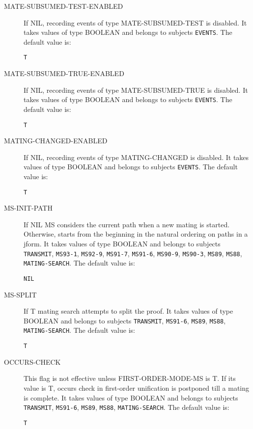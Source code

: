 \begin{description}
\item[MATE-SUBSUMED-TEST-ENABLED]  
If NIL, recording events of type MATE-SUBSUMED-TEST is disabled.
It takes values of type BOOLEAN and belongs to subjects \texttt{EVENTS}.  The default value is: \begin{lstlisting}
T
\end{lstlisting}

\item[MATE-SUBSUMED-TRUE-ENABLED]  
If NIL, recording events of type MATE-SUBSUMED-TRUE is disabled.
It takes values of type BOOLEAN and belongs to subjects \texttt{EVENTS}.  The default value is: \begin{lstlisting}
T
\end{lstlisting}

\item[MATING-CHANGED-ENABLED]  
If NIL, recording events of type MATING-CHANGED is disabled.
It takes values of type BOOLEAN and belongs to subjects \texttt{EVENTS}.  The default value is: \begin{lstlisting}
T
\end{lstlisting}

\item[MS-INIT-PATH]  
If NIL MS considers the current path when a new mating is started.
Otherwise, starts from the beginning in the natural ordering on paths in a 
jform.
It takes values of type BOOLEAN and belongs to subjects \texttt{TRANSMIT}, \texttt{MS93-1}, \texttt{MS92-9}, \texttt{MS91-7}, \texttt{MS91-6}, \texttt{MS90-9}, \texttt{MS90-3}, \texttt{MS89}, \texttt{MS88}, \texttt{MATING-SEARCH}.  The default value is: \begin{lstlisting}
NIL
\end{lstlisting}

\item[MS-SPLIT]  
If T mating search attempts to split the proof.
It takes values of type BOOLEAN and belongs to subjects \texttt{TRANSMIT}, \texttt{MS91-6}, \texttt{MS89}, \texttt{MS88}, \texttt{MATING-SEARCH}.  The default value is: \begin{lstlisting}
T
\end{lstlisting}

\item[OCCURS-CHECK]  
This flag is not effective unless FIRST-ORDER-MODE-MS is T. If its
    value is T, occurs check in first-order unification is postponed till a
    mating is complete.
It takes values of type BOOLEAN and belongs to subjects \texttt{TRANSMIT}, \texttt{MS91-6}, \texttt{MS89}, \texttt{MS88}, \texttt{MATING-SEARCH}.  The default value is: \begin{lstlisting}
T
\end{lstlisting}


\end{description}
